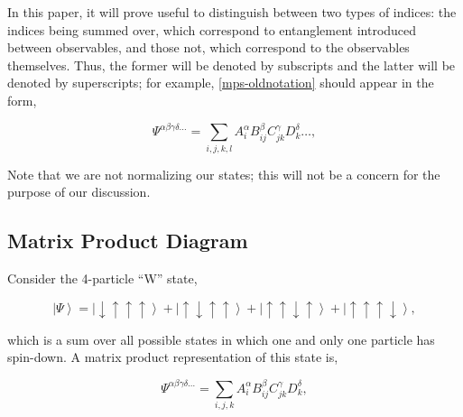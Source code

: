 \documentclass{amsbook}
\theoremstyle{plain}
\theoremstyle{definition}
\theoremstyle{remark}
\newcommand{\ket}[1]{\left|#1\right>}
\begin{document}

In this paper, it will prove useful to distinguish between two types of indices:  the indices being summed over, which correspond to entanglement introduced between observables, and those not, which correspond to the observables themselves.  Thus, the former will be denoted by subscripts and the latter will be denoted by superscripts; for example, \eqref{mps-oldnotation} should appear in the form,

$$\Psi^{\alpha\beta\gamma\delta\dots} = \sum_{i,j,k,l} A_i^\alpha B_{ij}^\beta C_{jk}^\gamma D_{k}^\delta \dots,$$

Note that we are not normalizing our states;  this will not be a concern for the purpose of our discussion.
\subsection{Matrix Product Diagram}

Consider the 4-particle ``W'' state,

$$\ket{\Psi} = \ket{\downarrow\uparrow\uparrow\uparrow} + \ket{\uparrow\downarrow\uparrow\uparrow} + \ket{\uparrow\uparrow\downarrow\uparrow} + \ket{\uparrow\uparrow\uparrow\downarrow},$$

\noindent which is a sum over all possible states in which one and only one particle has spin-down.  A matrix product representation of this state is,

$$\Psi^{\alpha\beta\gamma\delta\dots} = \sum_{i,j,k} A_i^\alpha B_{ij}^\beta C_{jk}^\gamma D_{k}^\delta,$$
\end{document}

